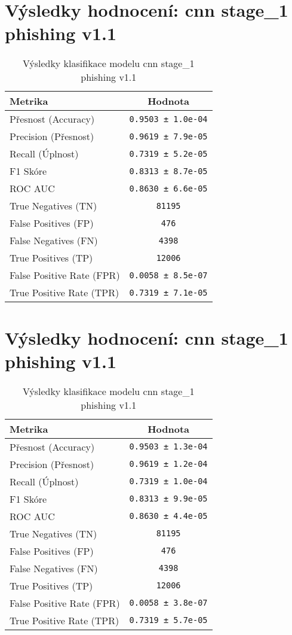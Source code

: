 \section*{Výsledky hodnocení: cnn stage_1 phishing v1.1}
\begin{table}[h!]
\centering
\begin{tabular}{|l|c|}
\hline
\textbf{Metrika} & \textbf{Hodnota} \\
\hline
Přesnost (Accuracy) & \texttt{0.9503 ± 1.0e-04} \\
Precision (Přesnost) & \texttt{0.9619 ± 7.9e-05} \\
Recall (Úplnost) & \texttt{0.7319 ± 5.2e-05} \\
F1 Skóre & \texttt{0.8313 ± 8.7e-05} \\
ROC AUC & \texttt{0.8630 ± 6.6e-05} \\
True Negatives (TN) & \texttt{81195} \\
False Positives (FP) & \texttt{476} \\
False Negatives (FN) & \texttt{4398} \\
True Positives (TP) & \texttt{12006} \\
False Positive Rate (FPR) & \texttt{0.0058 ± 8.5e-07} \\
True Positive Rate (TPR) & \texttt{0.7319 ± 7.1e-05} \\
\hline
\end{tabular}
\caption{Výsledky klasifikace modelu cnn stage_1 phishing v1.1}
\label{tab:phishing_cnn}
\end{table}

\section*{Výsledky hodnocení: cnn stage_1 phishing v1.1}
\begin{table}[h!]
\centering
\begin{tabular}{|l|c|}
\hline
\textbf{Metrika} & \textbf{Hodnota} \\
\hline
Přesnost (Accuracy) & \texttt{0.9503 ± 1.3e-04} \\
Precision (Přesnost) & \texttt{0.9619 ± 1.2e-04} \\
Recall (Úplnost) & \texttt{0.7319 ± 1.0e-04} \\
F1 Skóre & \texttt{0.8313 ± 9.9e-05} \\
ROC AUC & \texttt{0.8630 ± 4.4e-05} \\
True Negatives (TN) & \texttt{81195} \\
False Positives (FP) & \texttt{476} \\
False Negatives (FN) & \texttt{4398} \\
True Positives (TP) & \texttt{12006} \\
False Positive Rate (FPR) & \texttt{0.0058 ± 3.8e-07} \\
True Positive Rate (TPR) & \texttt{0.7319 ± 5.7e-05} \\
\hline
\end{tabular}
\caption{Výsledky klasifikace modelu cnn stage_1 phishing v1.1}
\label{tab:phishing_cnn}
\end{table}

